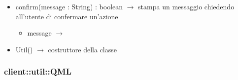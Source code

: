 \begin{description}
\begin{itemize}
	\item confirm(message : String) : boolean $\rightarrow$ stampa un messaggio chiedendo all'utente di confermare un'azione\begin{itemize}
		\item message $\rightarrow$ 
	\end{itemize}
	
	\item Util() $\rightarrow$ costruttore della classe
\end{itemize}

\end{description}

\vspace{0.5cm}
\hypertarget{client::util::QML}{}
\subsubsection[QML]{client::util::QML}
